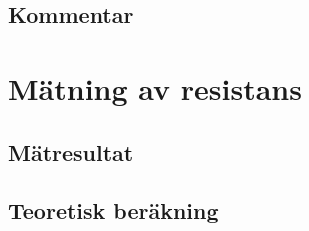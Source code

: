 \documentclass[11pt,a4paper]{article}
\begin{document}
\subsection{Kommentar}\label{}


\section{Mätning av resistans}\label{}

\subsection{Mätresultat}\label{}

\subsection{Teoretisk beräkning}\label{}



\end{document}
